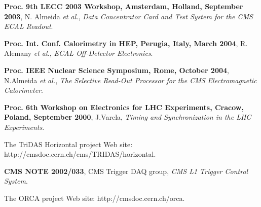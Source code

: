 \begin{thebibliography}{99}

 \textbf{Proc. 9th LECC 2003 Workshop, Amsterdam, Holland,
  September 2003}, N. Almeida \textit{et al.}, \textit{Data Concentrator Card and Test System for the CMS ECAL Readout}. 

 \textbf{Proc. Int. Conf. Calorimetry in HEP, Perugia,
  Italy, March 2004}, R. Alemany \textit{et al.}, \textit{ECAL Off-Detector Electronics}.

 \textbf{Proc. IEEE Nuclear Science Symposium, Rome, October
  2004}, N.Almeida \textit{et al.}, \textit{The Selective Read-Out Processor for the CMS Electromagnetic Calorimeter}.

 \textbf{Proc. 6th Workshop on Electronics for LHC
  Experiments, Cracow, Poland, September 2000}, J.Varela, \textit{Timing and Synchronization in the LHC Experiments}.

 The TriDAS Horizontal project Web site: http://cmsdoc.cern.ch/cms/TRIDAS/horizontal.

 \textbf{CMS NOTE 2002/033}, CMS Trigger DAQ group, \textit{CMS L1 Trigger Control System}.

 The ORCA project Web site: http://cmsdoc.cern.ch/orca.

\end{thebibliography}


